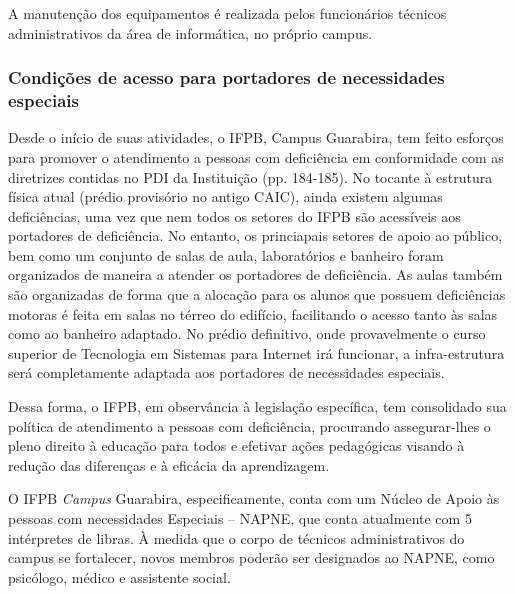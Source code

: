 A manutenção dos equipamentos é realizada pelos funcionários técnicos administrativos da área de informática, no próprio campus.

\subsubsection{Condições de acesso para portadores de necessidades especiais}

	Desde o início de suas atividades, o IFPB, Campus Guarabira, tem feito esforços para promover o atendimento a pessoas com deficiência em conformidade com as diretrizes contidas no PDI da Instituição (pp. 184-185). No tocante à estrutura física atual (pr\'edio provis\'orio no antigo CAIC), ainda existem algumas defici\^encias, uma vez que nem todos os setores do IFPB são acessíveis aos portadores de defici\^encia. No entanto, os princiapais setores de apoio ao p\'ublico, bem como um conjunto de salas de aula, laborat\'orios e banheiro foram organizados de maneira a atender os portadores de defici\^encia. As aulas também são organizadas de forma que a alocação para os alunos que possuem deficiências motoras é feita em salas no térreo do edifício, facilitando o acesso tanto às salas como ao banheiro adaptado. No pr\'edio definitivo, onde provavelmente o curso superior de Tecnologia em Sistemas para Internet ir\'a funcionar, a infra-estrutura ser\'a completamente adaptada aos portadores de necessidades especiais.

	Dessa forma, o IFPB, em observância à legislação específica, tem consolidado sua política de atendimento a pessoas com deficiência, procurando assegurar-lhes o pleno direito à educação para todos e efetivar ações pedagógicas visando à redução das diferenças e à eficácia da aprendizagem.
 
	O IFPB \textit{Campus} Guarabira, especificamente, conta com um Núcleo de Apoio às pessoas com necessidades Especiais – NAPNE, que conta atualmente com 5 intérpretes de libras. \`A medida que o corpo de t\'ecnicos administrativos do campus se fortalecer, novos membros poder\~ao ser designados ao NAPNE, como psic\'ologo, m\'edico e assistente social.



